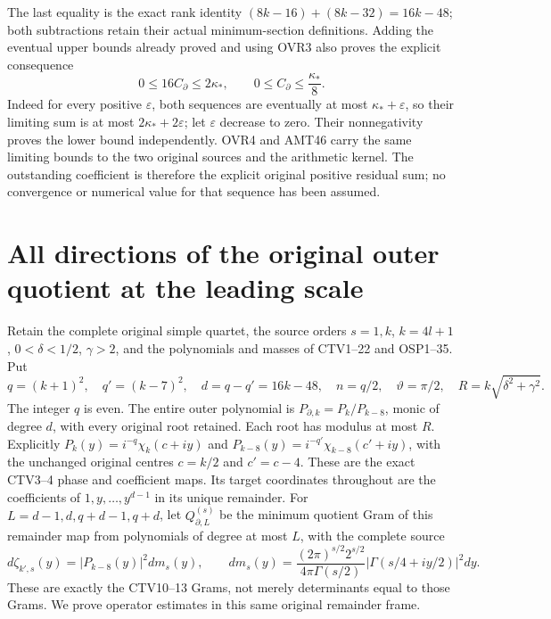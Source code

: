 \documentclass[11pt,a4paper]{article}
\begin{document}
The last equality is the exact rank identity
$(8k-16)+(8k-32)=16k-48$; both subtractions retain their actual
minimum-section definitions. Adding the eventual upper bounds
already proved and using OVR3 also proves the explicit consequence
\[
 0\le16C_\partial\le2\kappa_*,\qquad
 0\le C_\partial\le\frac{\kappa_*}{8}.
 \tag{OVR11}
\]
Indeed for every positive $\varepsilon$, both sequences are eventually
at most $\kappa_*+\varepsilon$, so their limiting sum is at most
$2\kappa_*+2\varepsilon$; let $\varepsilon$ decrease to zero.
Their nonnegativity proves the lower bound independently.
OVR4 and AMT46 carry the same limiting bounds to the two original
sources and the arithmetic kernel. The outstanding coefficient is
therefore the explicit original positive residual sum; no convergence
or numerical value for that sequence has been assumed.



\clearpage
\section{All directions of the original outer quotient at the leading scale}
\label{sec:OOQ}

Retain the complete original simple quartet, the source orders
$s=1,k$, $k=4l+1$, $0<\delta<1/2$, $\gamma>2$, and the
polynomials and masses of CTV1--22 and OSP1--35. Put
\[
 q=(k+1)^2,\quad q'=(k-7)^2,\quad d=q-q'=16k-48,\quad
 n=q/2,\quad \vartheta=\pi/2,\quad R=k\sqrt{\delta^2+\gamma^2}.
 \tag{OOQ1}
\]
The integer $q$ is even. The entire outer polynomial is
$P_{\partial,k}=P_k/P_{k-8}$, monic of degree $d$, with every
original root retained. Each root has modulus at most $R$.
Explicitly $P_k(y)=i^{-q}\chi_k(c+iy)$ and
$P_{k-8}(y)=i^{-q'}\chi_{k-8}(c'+iy)$, with the unchanged
original centres $c=k/2$ and $c'=c-4$. These are the exact
CTV3--4 phase and coefficient maps.
Its target coordinates throughout are the coefficients of
$1,y,\ldots,y^{d-1}$ in its unique remainder. For
$L=d-1,d,q+d-1,q+d$, let $Q_{\partial,L}^{(s)}$ be the
minimum quotient Gram of this remainder map from polynomials of
degree at most $L$, with the complete source
\[
 d\zeta_{k',s}(y)=|P_{k-8}(y)|^2dm_s(y),\qquad
 dm_s(y)=\frac{(2\pi)^{s/2}2^{s/2}}{4\pi\Gamma(s/2)}
          |\Gamma(s/4+iy/2)|^2dy .
 \tag{OOQ2}
\]
These are exactly the CTV10--13 Grams, not merely determinants
equal to those Grams. We prove operator estimates in this same
original remainder frame.
\end{document}
